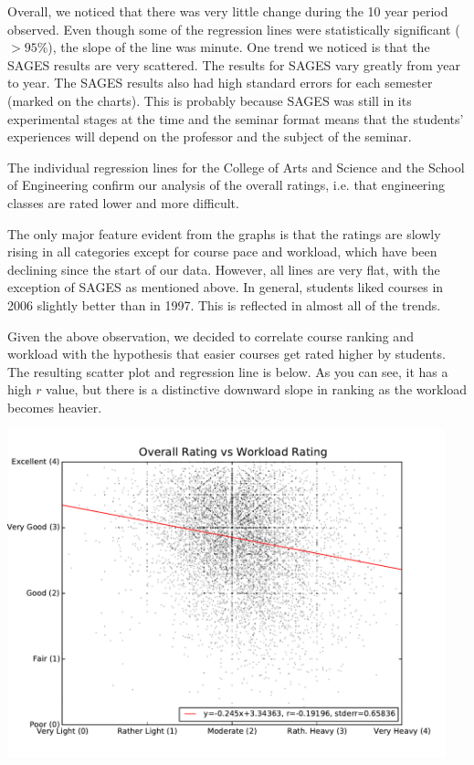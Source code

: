 \documentclass[12pt]{article}
\begin{document}
Overall, we noticed that there was very little change during the 10 year period observed. Even though some of the regression lines were statistically significant ($> 95\%$), the slope of the line was minute. One trend we noticed is that the SAGES results are very scattered. The results for SAGES vary greatly from year to year. The SAGES results also had high standard errors for each semester (marked on the charts). This is probably because SAGES was still in its experimental stages at the time and the seminar format means that the students' experiences will depend on the professor and the subject of the seminar.

The individual regression lines for the College of Arts and Science and the School of Engineering confirm our analysis of the overall ratings, i.e. that engineering classes are rated lower and more difficult.

The only major feature evident from the graphs is that the ratings are slowly rising in all categories except for course pace and workload, which have been declining since the start of our data. However, all lines are very flat, with the exception of SAGES as mentioned above. In general, students liked courses in 2006 slightly better than in 1997. This is reflected in almost all of the trends.

Given the above observation, we decided to correlate course ranking and workload with the hypothesis that easier courses get rated higher by students. The resulting scatter plot and regression line is below. As you can see, it has a high $r$ value, but there is a distinctive downward slope in ranking as the workload becomes heavier.

\begin{center}
    \includegraphics[width=5in]{figures/rating_vs_workload.pdf}
\end{center}
\end{document}
